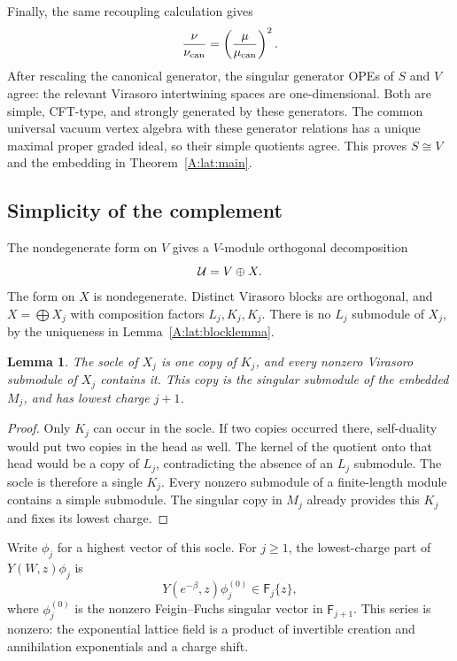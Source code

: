 \documentclass[11pt]{article}
\newtheorem{lemma}[theorem]{Lemma}
\numberwithin{equation}{section}
\begin{document}
Finally, the same recoupling calculation gives
\[
 \frac{\nu}{\nu_{\rm can}}=
 \left(\frac{\mu}{\mu_{\rm can}}\right)^2.
\]
After rescaling the canonical generator, the singular generator OPEs of $S$ and $V$ agree: the relevant Virasoro intertwining spaces are one-dimensional. Both are simple, CFT-type, and strongly generated by these generators. The common universal vacuum vertex algebra with these generator relations has a unique maximal proper graded ideal, so their simple quotients agree. This proves $S\cong V$ and the embedding in Theorem~\ref{A:lat:main}.

\subsection{Simplicity of the complement}
The nondegenerate form on $V$ gives a $V$-module orthogonal decomposition
\[
 \mathcal U=V\oplus X.
\]
The form on $X$ is nondegenerate. Distinct Virasoro blocks are orthogonal, and
$X=\bigoplus X_j$ with composition factors $L_j,K_j,K_j$. There is no $L_j$ submodule of $X_j$, by the uniqueness in Lemma~\ref{A:lat:blocklemma}.

\begin{lemma}\label{A:lat:essential}
The socle of $X_j$ is one copy of $K_j$, and every nonzero Virasoro submodule of $X_j$ contains it. This copy is the singular submodule of the embedded $M_j$, and has lowest charge $j+1$.
\end{lemma}
\begin{proof}
Only $K_j$ can occur in the socle. If two copies occurred there, self-duality would put two copies in the head as well. The kernel of the quotient onto that head would be a copy of $L_j$, contradicting the absence of an $L_j$ submodule. The socle is therefore a single $K_j$. Every nonzero submodule of a finite-length module contains a simple submodule. The singular copy in $M_j$ already provides this $K_j$ and fixes its lowest charge.
\end{proof}

Write $\phi_j$ for a highest vector of this socle. For $j\geq1$, the lowest-charge part of $Y(W,z)\phi_j$ is
\begin{equation}\label{A:lat:lowering}
 Y(e^{-\beta},z)\phi_j^{(0)}\in\mathsf F_j\{z\},
\end{equation}
where $\phi_j^{(0)}$ is the nonzero Feigin--Fuchs singular vector in $\mathsf F_{j+1}$. This series is nonzero: the exponential lattice field is a product of invertible creation and annihilation exponentials and a charge shift.
\end{document}
